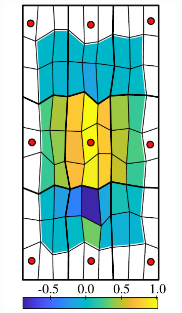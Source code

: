 \begin{figure} [htbp]
\begin{subfigure}[t]{0.22\textwidth}
  \centerline{\includegraphics[width=\linewidth]{figs/MPFA_9x9_c}}
  \caption{\label{fig:mpfa_demo_orig}}
\end{subfigure}
\hfill
\begin{subfigure}[t]{0.22\textwidth}

\end{subfigure}
\end{figure}
